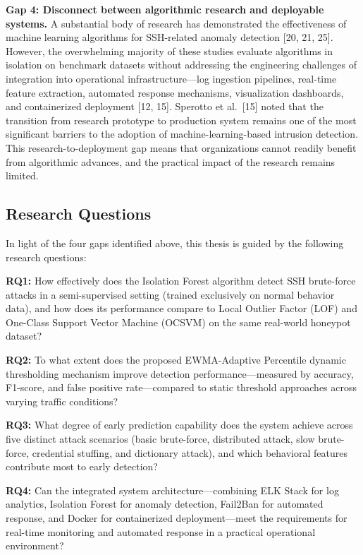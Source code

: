 \documentclass[
  a4paper]{report}
\begin{document}
\textbf{Gap 4: Disconnect between algorithmic research and deployable
systems.} A substantial body of research has demonstrated the
effectiveness of machine learning algorithms for SSH-related anomaly
detection {[}20, 21, 25{]}. However, the overwhelming majority of these
studies evaluate algorithms in isolation on benchmark datasets without
addressing the engineering challenges of integration into operational
infrastructure---log ingestion pipelines, real-time feature extraction,
automated response mechanisms, visualization dashboards, and
containerized deployment {[}12, 15{]}. Sperotto et al.~{[}15{]} noted
that the transition from research prototype to production system remains
one of the most significant barriers to the adoption of
machine-learning-based intrusion detection. This research-to-deployment
gap means that organizations cannot readily benefit from algorithmic
advances, and the practical impact of the research remains limited.

\subsection{Research Questions}\label{research-questions}

In light of the four gaps identified above, this thesis is guided by the
following research questions:

\textbf{RQ1:} How effectively does the Isolation Forest algorithm detect
SSH brute-force attacks in a semi-supervised setting (trained
exclusively on normal behavior data), and how does its performance
compare to Local Outlier Factor (LOF) and One-Class Support Vector
Machine (OCSVM) on the same real-world honeypot dataset?

\textbf{RQ2:} To what extent does the proposed EWMA-Adaptive Percentile
dynamic thresholding mechanism improve detection performance---measured
by accuracy, F1-score, and false positive rate---compared to static
threshold approaches across varying traffic conditions?

\textbf{RQ3:} What degree of early prediction capability does the system
achieve across five distinct attack scenarios (basic brute-force,
distributed attack, slow brute-force, credential stuffing, and
dictionary attack), and which behavioral features contribute most to
early detection?

\textbf{RQ4:} Can the integrated system architecture---combining ELK
Stack for log analytics, Isolation Forest for anomaly detection,
Fail2Ban for automated response, and Docker for containerized
deployment---meet the requirements for real-time monitoring and
automated response in a practical operational environment?
\end{document}
